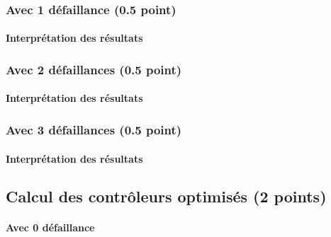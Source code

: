 \documentclass[a4paper]{book}
\begin{document}
\subsubsection{Avec 1 défaillance (0.5 point)}





\paragraph{Interprétation des résultats}

\subsubsection{Avec 2 défaillances (0.5 point)}




%
\paragraph{Interprétation des résultats}

\subsubsection{Avec 3 défaillances (0.5 point)}




%
\paragraph{Interprétation des résultats}

\subsection{Calcul des contrôleurs optimisés (2 points)}
\paragraph{Avec 0 défaillance}\ \\

\end{document}
